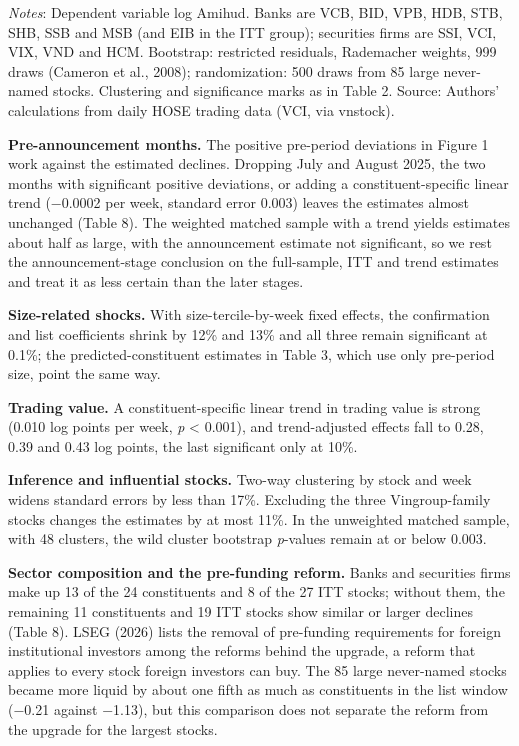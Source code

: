 \documentclass[review,authoryear,12pt]{elsarticle}
\begin{document}
\emph{Notes}: Dependent variable log Amihud. Banks are VCB, BID, VPB,
HDB, STB, SHB, SSB and MSB (and EIB in the ITT group); securities firms
are SSI, VCI, VIX, VND and HCM. Bootstrap: restricted residuals,
Rademacher weights, 999 draws (Cameron et al., 2008); randomization: 500
draws from 85 large never-named stocks. Clustering and significance
marks as in Table 2. Source: Authors' calculations from daily HOSE
trading data (VCI, via vnstock).

\textbf{Pre-announcement months.} The positive pre-period deviations in
Figure 1 work against the estimated declines. Dropping July and August
2025, the two months with significant positive deviations, or adding a
constituent-specific linear trend (−0.0002 per week, standard error
0.003) leaves the estimates almost unchanged (Table 8). The weighted
matched sample with a trend yields estimates about half as large, with
the announcement estimate not significant, so we rest the
announcement-stage conclusion on the full-sample, ITT and trend
estimates and treat it as less certain than the later stages.

\textbf{Size-related shocks.} With size-tercile-by-week fixed effects,
the confirmation and list coefficients shrink by 12\% and 13\% and all
three remain significant at 0.1\%; the predicted-constituent estimates
in Table 3, which use only pre-period size, point the same way.

\textbf{Trading value.} A constituent-specific linear trend in trading
value is strong (0.010 log points per week, \emph{p} \textless{} 0.001),
and trend-adjusted effects fall to 0.28, 0.39 and 0.43 log points, the
last significant only at 10\%.

\textbf{Inference and influential stocks.} Two-way clustering by stock
and week widens standard errors by less than 17\%. Excluding the three
Vingroup-family stocks changes the estimates by at most 11\%. In the
unweighted matched sample, with 48 clusters, the wild cluster bootstrap
\emph{p}-values remain at or below 0.003.

\textbf{Sector composition and the pre-funding reform.} Banks and
securities firms make up 13 of the 24 constituents and 8 of the 27 ITT
stocks; without them, the remaining 11 constituents and 19 ITT stocks
show similar or larger declines (Table 8). LSEG (2026) lists the removal
of pre-funding requirements for foreign institutional investors among
the reforms behind the upgrade, a reform that applies to every stock
foreign investors can buy. The 85 large never-named stocks became more
liquid by about one fifth as much as constituents in the list window
(−0.21 against −1.13), but this comparison does not separate the reform
from the upgrade for the largest stocks.
\end{document}
